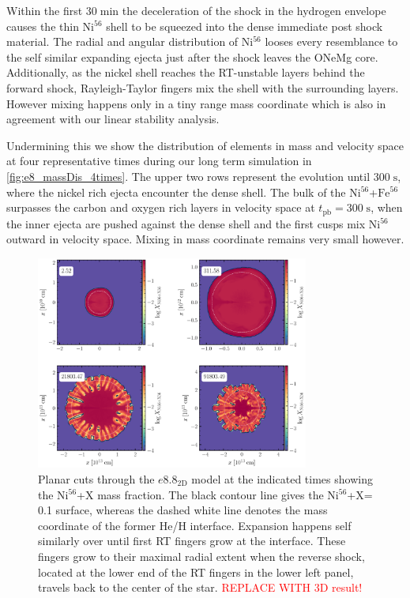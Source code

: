 \documentclass[fleqn,usenatbib]{mnras}
\newcommand{\nickel}{$\mathrm{Ni^{56}}$\xspace}
\newcommand{\tracer}{$\mathrm{X}$\xspace}
\newcommand{\iron}{$\mathrm{Fe^{56}}$\xspace}
\begin{document}
Within the first $30\;\mathrm{min}$ the deceleration of the shock in the hydrogen envelope causes the thin \nickel shell to be squeezed into the dense immediate post shock material. The radial and angular distribution of \nickel looses every resemblance to the self similar expanding ejecta just after the shock leaves the ONeMg core.
Additionally, as the nickel shell reaches the RT-unstable layers behind the forward shock, Rayleigh-Taylor fingers mix the shell with the surrounding layers. However mixing happens only in a tiny range mass coordinate which is also in agreement with our linear stability analysis.

Undermining this we show the distribution of elements in mass and velocity space at four representative times during our long term simulation in \autoref{fig:e8_massDis_4times}. The upper two rows represent the evolution until $300\;\mathrm{s}$, where the nickel rich ejecta encounter the dense shell.
The bulk of the \nickel+\iron surpasses the carbon and oxygen rich layers in velocity space at $t_{\mathrm{pb}}=300\;\mathrm{s}$, when the inner ejecta are pushed against the dense shell and the first cusps mix \nickel outward in velocity space. Mixing in mass coordinate remains very small however.

\begin{figure}
 \centering
 \includegraphics[width=0.8\textwidth]{pic/species_cuts_e10_2d_4times.pdf} 
 \caption{Planar cuts through the $e8.8_{\mathrm{2D}}$ model at the indicated times showing the \nickel+\tracer mass fraction. The black contour line gives the \nickel+\tracer = 0.1 surface, whereas the dashed white line denotes the mass coordinate of the former He/H interface. Expansion happens self similarly over until first RT fingers grow at the interface. These fingers grow to their maximal radial extent when the reverse shock, located at the lower end of the RT fingers in the lower left panel, travels back to the center of the star. \textcolor{red}{REPLACE WITH 3D result!}}
 \label{fig:e8_3d_species_4times}
\end{figure}
\end{document}
